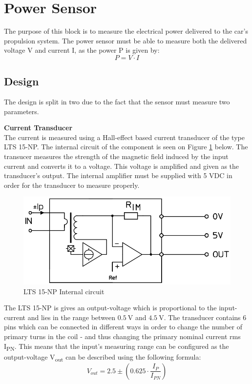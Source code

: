 \newpage
\section{Power Sensor}
The purpose of this block is to measure the electrical power delivered to the car's propulsion system. The power sensor must be able to measure both the delivered voltage V and  current I, as the power P is given by:
\begin{equation}
	P = V \cdot I
\end{equation}

\subsection{Design}
The design is split in two due to the fact that the sensor must measure two parameters.

\textbf{Current Transducer}\\
The current is measured using a Hall-effect based current transducer of the type LTS 15-NP. The internal circuit of the component is seen on Figure \ref{fig:LTS_internal_circuit} below. The transucer measures the strength of the magnetic field induced by the input current and converts it to a voltage. This voltage is amplified and given as the transducer's output. The internal amplifier must be supplied with 5 VDC in order for the transducer to measure properly.

\begin{figure}[H]
	\centering
	\includegraphics[width=0.5\linewidth]{Hardware/Pictures/LTS_circuit}
	\caption{LTS 15-NP Internal circuit}
	\label{fig:LTS_internal_circuit}
\end{figure}

The LTS 15-NP is gives an output-voltage which is proportional to the input-current and lies in the range between $\SI{0.5}{\volt}$ and $\SI{4.5}{\volt}$. The transducer contains 6 pins which can be connected in different ways in order to change the number of primary turns in the coil - and thus changing the primary nominal current rms I\textsubscript{PN}. This means that the input's measuring range can be configured as the output-voltage V\textsubscript{out} can be described using the following formula:
\begin{equation}
	V_{out} = 2.5 \pm \left( 0.625 \cdot \frac{I_{P}}{I_{PN}} \right)
	\label{eq:current_transducer}
\end{equation}

